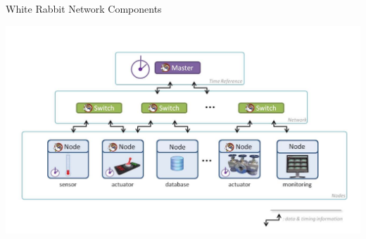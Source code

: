 \documentclass[compress,red]{beamer}
\begin{document}
\subsection{}
\begin{frame}{White Rabbit Network Components}


    \begin{center}
    \includegraphics[width=1.0\textwidth]{network/WRnetwork-eva.pdf}  
    \end{center}

\end{frame}
\end{document}
